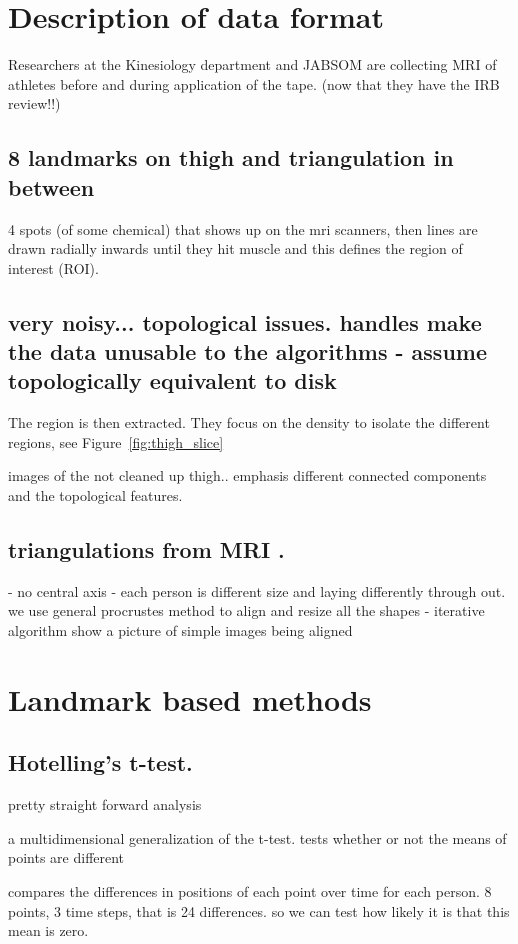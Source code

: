 \documentclass[letterpaper, 12 pt, conference]{ieeeconf}  %
\begin{document}
\section{Description of data format}

Researchers at the Kinesiology department and JABSOM are collecting MRI of athletes before and during application of the tape.
(now that they have the IRB review!!)
\subsection{8 landmarks on thigh and triangulation in between}
4 spots (of some chemical) that shows up on the mri scanners, then lines are drawn radially inwards until they hit muscle and this defines the region of interest (ROI). 
\subsection{very noisy... topological issues. handles make the data unusable to the algorithms - assume topologically equivalent to disk}
The region is then extracted.  They focus on the density to isolate the different regions, see Figure~\ref{fig:thigh_slice} 

images of the not cleaned up thigh..  emphasis different connected components and the topological features.  
\subsection{triangulations from MRI .}
- no central axis - each person is different size and laying differently through out.  we use general procrustes method to align and resize all the shapes - iterative algorithm
show a picture of simple images being aligned



\section{Landmark based methods}
\subsection{Hotelling's t-test. }
pretty straight forward analysis

 a multidimensional generalization of the t-test.  tests whether or not the means of points are different
 
compares the differences in positions of each point over time for each person. 8 points, 3 time steps, that is 24 differences.  so we can test how likely it is that this mean is zero.
\end{document}
